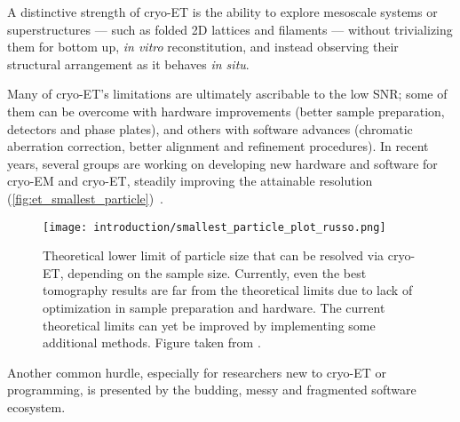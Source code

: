 A distinctive strength of cryo-ET is the ability to explore mesoscale systems or superstructures --- such as folded 2D lattices and filaments --- without trivializing them for bottom up, \textit{in vitro} reconstitution, and instead observing their structural arrangement as it behaves \textit{in situ}.

Many of cryo-ET's limitations are ultimately ascribable to the low SNR; some of them can be overcome with hardware improvements (better sample preparation, detectors and phase plates), and others with software advances (chromatic aberration correction, better alignment and refinement procedures).
In recent years, several groups are working on developing new hardware and software for cryo-EM and cryo-ET, steadily improving the attainable resolution (\autoref{fig:et_smallest_particle})~\cite{russoCryomicroscopySituWhat2022}.

\begin{figure}[ht]
    \centering
    \texttt{[image: introduction/smallest\_particle\_plot\_russo.png]}
    \caption[Particle size limit in cryo-ET]{Theoretical lower limit of particle size that can be resolved via cryo-ET, depending on the sample size. Currently, even the best tomography results are far from the theoretical limits due to lack of optimization in sample preparation and hardware. The current theoretical limits can yet be improved by implementing some additional methods. Figure taken from \citet{russoElectronCryomicroscopeHardware2023}.}
    \label{fig:et_smallest_particle}
\end{figure}

Another common hurdle, especially for researchers new to cryo-ET or programming, is presented by the budding, messy and fragmented software ecosystem. 
